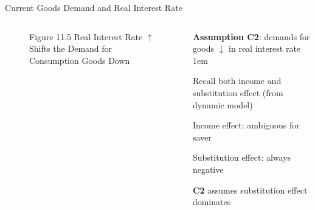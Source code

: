 \documentclass[11pt,aspectratio=43]{beamer}
\let\olditemize=\itemize
\let\endolditemize=\enditemize
\renewenvironment{itemize}{\olditemize \itemsep1em}{\endolditemize}
\theoremstyle{definition}
\begin{document}
\begin{frame}{Current Goods Demand and Real Interest Rate}
\label{slide:Current_Goods_Demand_and_Real_Interest_Rate}
    \begin{columns}
        \begin{column}{0.5\textwidth}
            \begin{figure}
                \caption{\scriptsize Figure 11.5  Real Interest Rate $ \uparrow  $ Shifts the Demand for Consumption Goods Down}
            \end{figure}
        \end{column}
        \begin{column}{0.5\textwidth}
            \textbf{Assumption C2}: demands for goods $ \downarrow  $ in real interest rate
            \begin{itemize}
                \item Recall both \alert{income and substitution effect} (from dynamic model)
                \item Income effect: ambiguous for saver
                \item Substitution effect: always negative
                \item \textbf{C2} assumes substitution effect dominates
            \end{itemize}
        \end{column}
    \end{columns}
\end{frame}
\end{document}
